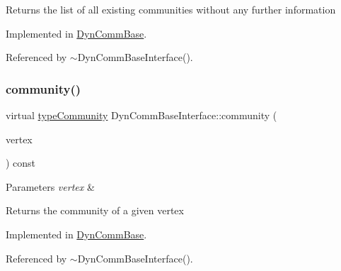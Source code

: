 \begin{DoxyReturn}{Returns}
the list of all existing communities without any further information 
\end{DoxyReturn}


Implemented in \hyperlink{classDynCommBase_a064d9909a91cfe25acf05e6bd1fc967d}{Dyn\+Comm\+Base}.



Referenced by $\sim$\+Dyn\+Comm\+Base\+Interface().

\mbox{\label{classDynCommBaseInterface_a9453a177580033aa1d4d9f165350ceba}} 
\subsubsection{\texorpdfstring{community()}{community()}}
{\footnotesize\ttfamily virtual \hyperlink{graphUndirectedGroupable_8h_a914da95c9ea7f14f4b7f875c36818556}{type\+Community} Dyn\+Comm\+Base\+Interface\+::community (\begin{DoxyParamCaption}\item[{\hyperlink{edge_8h_a5fbd20c46956d479cb10afc9855223f6}{type\+Vertex}}]{vertex }\end{DoxyParamCaption}) const\hspace{0.3cm}{\ttfamily [pure virtual]}}


\begin{DoxyParams}{Parameters}
{\em vertex} & \\
\hline
\end{DoxyParams}
\begin{DoxyReturn}{Returns}
the community of a given vertex 
\end{DoxyReturn}


Implemented in \hyperlink{classDynCommBase_a651753518a2de4ea52caea518e74d878}{Dyn\+Comm\+Base}.



Referenced by $\sim$\+Dyn\+Comm\+Base\+Interface().

\mbox{\label{classDynCommBaseInterface_aa61588ce385fd66855e17747cf188a85}} 
